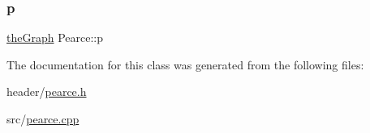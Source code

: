 \subsubsection{\texorpdfstring{p}{p}}
{\footnotesize\ttfamily \hyperlink{class_graph_component_a982e0748a6e1b8dc74986f5f8b3dca5c_a982e0748a6e1b8dc74986f5f8b3dca5c}{the\+Graph} Pearce\+::p}



The documentation for this class was generated from the following files\+:\begin{DoxyCompactItemize}
\item 
header/\hyperlink{pearce_8h}{pearce.\+h}\item 
src/\hyperlink{pearce_8cpp}{pearce.\+cpp}\end{DoxyCompactItemize}
